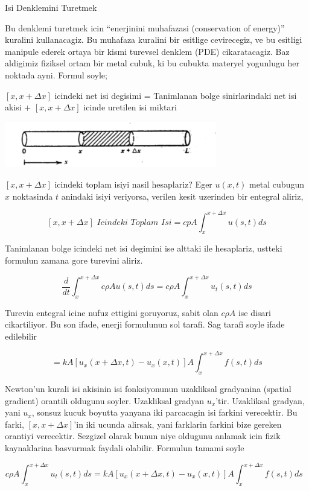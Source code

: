 \documentclass[12pt,fleqn]{article}
\begin{document}
Isi Denklemini Turetmek 

Bu denklemi turetmek icin ``enerjinini muhafazasi (conservation of
energy)'' kuralini kullanacagiz. Bu muhafaza kuralini bir esitlige
cevirecegiz, ve bu esitligi manipule ederek ortaya bir kismi turevsel
denklem (PDE) cikaratacagiz. Baz aldigimiz fiziksel ortam bir metal cubuk,
ki bu cubukta materyel yogunlugu her noktada ayni.  Formul soyle;

$[x,x+\Delta x]$ icindeki net isi degisimi = Tanimlanan bolge
sinirlarindaki net isi akisi + $[x,x+\Delta x]$ icinde uretilen isi miktari

\includegraphics[height=2cm]{heat_1.png}

$[x,x+\Delta x]$ icindeki toplam isiyi nasil hesaplariz? Eger $u(x,t)$
metal cubugun $x$ noktasinda $t$ anindaki isiyi veriyorsa, verilen kesit
uzerinden bir entegral aliriz,

\[ [x,x+\Delta x] \textit{ Icindeki Toplam Isi} = 
cpA \int _{ x}^{x+\Delta x}u(s,t) ds
   \]

Tanimlanan bolge icindeki net isi degimini ise alttaki ile hesaplariz,
ustteki formulun zamana gore turevini aliriz. 


\[ \frac{d}{dt} \int _{ x}^{x+\Delta x} c\rho A u(s,t) ds = 
c\rho A  \int _{ x}^{x+\Delta x} u_t(s,t) ds
  \]


Turevin entegral icine nufuz ettigini goruyoruz, sabit olan $c\rho A$ ise
disari cikartiliyor. Bu son ifade, enerji formulunun sol tarafi. Sag tarafi
soyle ifade edilebilir

\[ = kA [ u_x(x+\Delta x,t) - u_x(x,t)] A \int _{x}^{x+\Delta x} f(s,t) ds \]

Newton'un kurali isi akisinin isi fonksiyonunun uzakliksal gradyanina
(spatial gradient) orantili oldugunu soyler. Uzakliksal gradyan
$u_x$'tir. Uzakliksal gradyan, yani $u_x$, sonsuz kucuk boyutta yanyana iki
parcacagin isi farkini verecektir. Bu farki, $[x,x+\Delta x]$'in iki ucunda
alirsak, yani farklarin farkini bize gereken orantiyi verecektir. Sezgizel
olarak bunun niye oldugunu anlamak icin fizik kaynaklarina basvurmak
faydali olabilir. Formulun tamami soyle

\[ c\rho A  \int _{ x}^{x+\Delta x} u_t(s,t) ds =
kA [ u_x(x+\Delta x,t) - u_x(x,t)] A \int _{x}^{x+\Delta x} f(s,t) ds 
\ \ \ \label{1}
 \]
\end{document}
